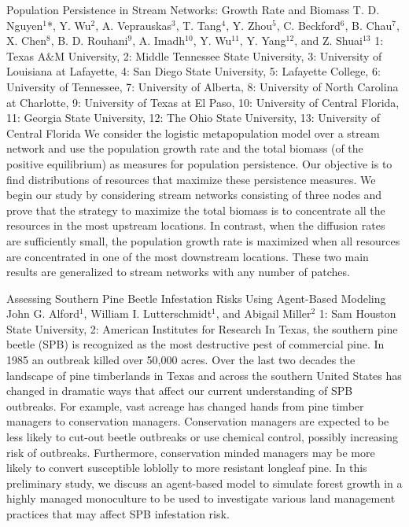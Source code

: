 \begin{addmargin}[2em]{0em}
\vspace{1.5ex}
\abs
{Population Persistence in Stream Networks: Growth Rate and Biomass}
{ T. D. Nguyen$^{1}$*, Y. Wu$^{2}$, A. Veprauskas$^{3}$, T. Tang$^{4}$, Y. Zhou$^{5}$, C. Beckford$^{6}$, B. Chau$^{7}$, X. Chen$^{8}$, B. D. Rouhani$^{9}$, A. Imadh$^{10}$, Y. Wu$^{11}$, Y. Yang$^{12}$, and Z. Shuai$^{13}$ }
{1: Texas A$\&$M University, 2: Middle Tennessee State University, 3: University of Louisiana at Lafayette, 4: San Diego State University, 5: Lafayette College, 6: University of Tennessee, 7: University of Alberta, 8: University of North Carolina at Charlotte, 9: University of Texas at El Paso, 10: University of Central Florida, 11: Georgia State University, 12: The Ohio State University, 13: University of Central Florida}
{We consider the logistic metapopulation model over a stream network and use the population growth rate and the total biomass (of the positive equilibrium) as measures for population persistence. Our objective is to find distributions of resources that maximize these persistence measures. We begin our study by considering stream networks consisting of three nodes and prove that the strategy to maximize the total biomass is to concentrate all the resources in the most upstream locations. In contrast, when the diffusion rates are sufficiently small, the population growth rate is maximized when all resources are concentrated in one of the most downstream locations. These two main results are generalized to stream networks with any number of patches.}


\vspace{1.5ex}
\abs
{Assessing Southern Pine Beetle Infestation Risks Using Agent-Based Modeling}
{John G. Alford$^{1}$, William I. Lutterschmidt$^{1}$, and Abigail Miller$^{2}$}
{1: Sam Houston State University, 2: American Institutes for Research}
{In Texas, the southern pine beetle (SPB) is recognized as the most destructive pest of commercial pine. In 1985 an outbreak killed over 50,000 acres. Over the last two decades the landscape of pine timberlands in Texas and across the southern United States has changed in dramatic ways that affect our current understanding of SPB outbreaks. For example, vast acreage has changed hands from pine timber managers to conservation managers. Conservation managers are expected to be less likely to cut-out beetle outbreaks or use chemical control, possibly increasing risk of outbreaks. Furthermore, conservation minded managers may be more likely to convert susceptible loblolly to more resistant longleaf pine. In this preliminary study, we discuss an agent-based model to simulate forest growth in a highly managed monoculture to be used to investigate various land management practices that may affect SPB infestation risk.}



\end{addmargin}
